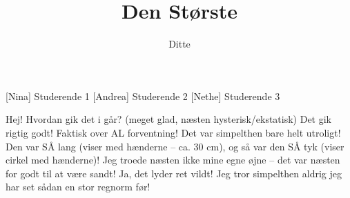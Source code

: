 \documentclass[a4paper,11pt]{article}
\title{Den Største}
\author{Ditte}
\begin{document}
\maketitle

\begin{roles}
    [Nina] Studerende 1
[Andrea] Studerende 2
[Nethe] Studerende 3
\end{roles}

\begin{props}
\end{props}


\begin{sketch}



 Hej! Hvordan gik det i går?
 (meget glad, næsten hysterisk/ekstatisk) Det gik rigtig godt! Faktisk over AL forventning! Det var simpelthen bare helt utroligt! Den var SÅ lang (viser med hænderne – ca. 30 cm), og så var den SÅ tyk (viser cirkel med hænderne)! Jeg troede næsten ikke mine egne øjne – det var næsten for godt til at være sandt!
 Ja, det lyder ret vildt!
 Jeg tror simpelthen aldrig jeg har set sådan en stor regnorm før!



\end{sketch}
\end{document}
